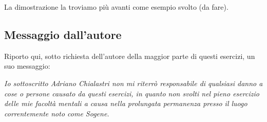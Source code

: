 La dimostrazione la troviamo più avanti come esempio svolto (da fare).

\newpage

\subsection{Messaggio dall'autore}

Riporto qui, sotto richiesta dell'autore della maggior parte di questi esercizi, un suo messaggio:

\textit{Io sottoscritto Adriano Chialastri non mi riterrò responsabile di qualsiasi danno a cose o persone causato da questi esercizi, in quanto non svolti nel pieno esercizio delle mie facoltà mentali a causa nella prolungata permanenza presso il luogo correntemente noto come Sogene.
}

